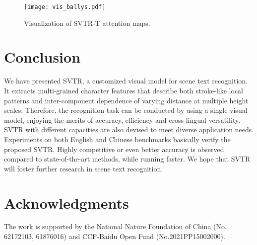 \documentclass{article}
\begin{document}
\begin{figure}[ht]  
\centering  
\texttt{[image: vis\_ballys.pdf]}  
\caption{Visualization of SVTR-T attention maps.}  
\label{fig:vis}  
\end{figure}

\section{Conclusion}
We have presented SVTR, a customized visual model for scene text recognition. It extracts multi-grained character features that describe both stroke-like local patterns and inter-component dependence of varying distance at multiple height scales. Therefore, the recognition task can be conducted by using a single visual model, enjoying the merits of accuracy, efficiency and cross-lingual versatility. SVTR with different capacities are also devised to meet diverse application needs. Experiments on both English and Chinese benchmarks basically verify the proposed SVTR. Highly competitive or even better accuracy is observed compared to state-of-the-art methods, while running faster. We hope that SVTR will foster further research in scene text recognition.
\section*{Acknowledgments}

The work is supported by the National Nature Foundation of China (No. 62172103, 61876016) and CCF-Baidu Open Fund (No.2021PP15002000). 



\end{document}
